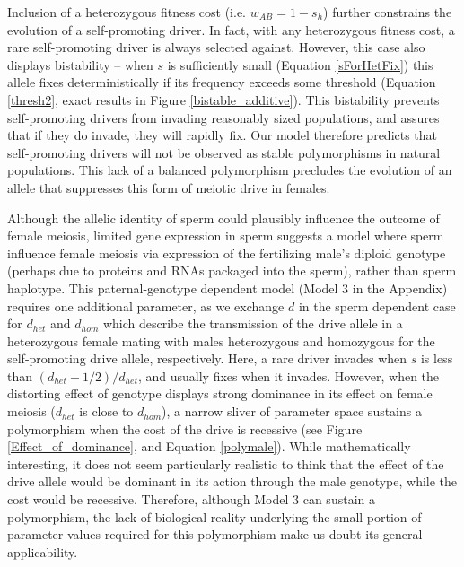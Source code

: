 \documentclass[12pt,letterpaper]{article}
\begin{document}
Inclusion of a heterozygous fitness cost (i.e. $w_{AB}=1-s_h$)
	further constrains the evolution of a self-promoting driver. 
In fact, with any heterozygous fitness cost, a rare self-promoting
	driver is always selected against. 
However, this case also displays bistability -- 
	when $s$ is sufficiently small (Equation \ref{sForHetFix}) this allele fixes deterministically if its 
	frequency exceeds some threshold  (Equation \ref{thresh2}, exact results in 
	Figure \ref{bistable_additive}).
This bistability prevents self-promoting drivers from invading 	
	reasonably sized populations, and assures that if they do invade, they will rapidly fix.
Our model therefore predicts that self-promoting drivers will not be
	observed as stable polymorphisms in natural populations. 
This lack of a balanced polymorphism %
	precludes the evolution of an
	allele that suppresses this form of meiotic drive in females. \newline 

Although the allelic identity of sperm could plausibly influence the outcome of female meiosis, 
	limited gene expression in sperm \citep[e.g.][]{Joseph2004}
	suggests a model where sperm influence female meiosis via expression of the fertilizing male's
	diploid genotype (perhaps due to proteins and RNAs packaged into the sperm), rather than sperm haplotype.
This paternal-genotype dependent model (Model 3 in the Appendix) requires one additional parameter, as we exchange $d$ in the sperm dependent case for $d_{het}$ and $d_{hom}$ which describe the transmission of the drive allele in a heterozygous female mating with males heterozygous and homozygous for the self-promoting drive allele, respectively.  
Here, a rare driver invades when $s$ is less than $(d_{het}-1/2)/d_{het}$, and usually fixes when it invades.
However, when the distorting effect of genotype displays strong dominance in its
	effect on female meiosis ($d_{het}$ is close to $d_{hom}$), 
	a narrow sliver of parameter space sustains a polymorphism
	when the cost of the drive is recessive
	(see Figure \ref{Effect_of_dominance}, and Equation \ref{polymale}).  
While mathematically interesting, it does not seem particularly realistic to think that the
	effect of the drive allele would be dominant in its action through the
	male genotype, while the cost would be recessive. 
Therefore, although Model 3 can sustain a polymorphism, 
	the lack of biological reality underlying the small portion of parameter values 
	required for this polymorphism make us doubt its general applicability. \newline 
\end{document}
